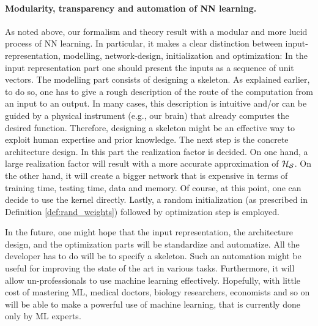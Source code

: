 \paragraph{Modularity, transparency and automation of NN learning.}
As noted above, our formalism and theory result with a modular and more lucid process of NN learning.
In particular, it makes a clear distinction between input-representation, modelling, network-design, initialization and optimization:
In the input representation part one should present the inputs as a sequence of unit vectors.
The modelling part consists of designing a skeleton. As explained earlier, to do so, one has to give a rough description of the route of the computation from an input to an output.
In many cases, this description is intuitive and/or can be guided by a physical instrument (e.g., our brain) that already computes the desired function. Therefore, designing a skeleton might be an effective way to exploit human expertise and prior knowledge.
The next step is the concrete architecture design. In this part the realization factor is decided. On one hand, a large realization factor will result with a more accurate approximation of ${\cal H}_{\cal S}$. On the other hand, it will create a bigger network that is expensive in terms of training time, testing time, data and memory. Of course, at this point, one can decide to use the kernel directly.
Lastly, a random initialization (as prescribed in Definition \ref{def:rand_weights}) followed by optimization step is employed.


In the future, one might hope that the input representation, the architecture design, and the optimization parts will be standardize and automatize. All the developer has to do will be to specify a skeleton.
Such an automation might be useful for improving the state of the art in various tasks. Furthermore, it will allow un-professionals to use machine learning effectively. Hopefully, with little cost of mastering ML, medical doctors, biology researchers, economists and so on will be able to make a powerful use of machine learning, that is currently done only by ML experts.


